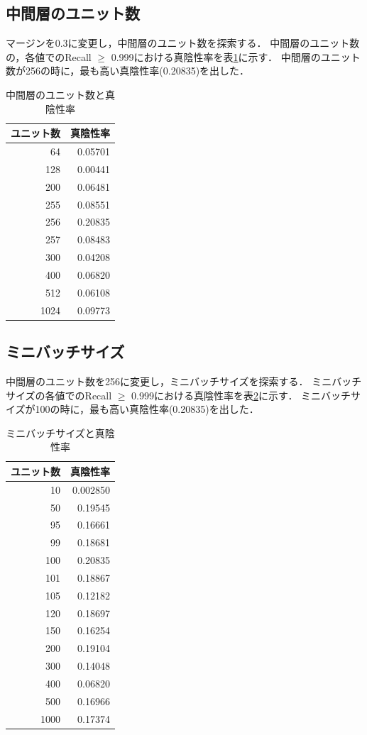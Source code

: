 \documentclass[10pt]{jarticle}
\begin{document}
\subsection{中間層のユニット数}
マージンを0.3に変更し，中間層のユニット数を探索する．
中間層のユニット数の，各値でのRecall $\ge$ 0.999における真陰性率を表\ref{mid}に示す．
中間層のユニット数が256の時に，最も高い真陰性率(0.20835)を出した．
\begin{table}[H]
\centering
\caption{中間層のユニット数と真陰性率}
\label{mid}
\begin{tabular}{rr} \hline
ユニット数 & 真陰性率 \\ \hline
64 & 0.05701  \\ 
128 & 0.00441 \\
200 & 0.06481 \\
255 & 0.08551 \\
256 & 0.20835 \\
257 & 0.08483 \\
300 & 0.04208 \\
400 & 0.06820 \\
512 & 0.06108 \\
1024 & 0.09773 \\ \hline
\end{tabular}
\end{table}

\subsection{ミニバッチサイズ}
中間層のユニット数を256に変更し，ミニバッチサイズを探索する．
ミニバッチサイズの各値でのRecall $\ge$ 0.999における真陰性率を表\ref{batch}に示す．
ミニバッチサイズが100の時に，最も高い真陰性率(0.20835)を出した．
\begin{table}[H]
\centering
\caption{ミニバッチサイズと真陰性率}
\label{batch}
\begin{tabular}{rr} \hline
ユニット数 & 真陰性率 \\ \hline
10 & 0.002850  \\ 
50 & 0.19545 \\
95 & 0.16661 \\
99 & 0.18681 \\
100 & 0.20835 \\
101 & 0.18867 \\
105 & 0.12182 \\
120 & 0.18697 \\
150 & 0.16254 \\
200 & 0.19104 \\
300 & 0.14048 \\
400 & 0.06820 \\
500 & 0.16966 \\
1000 & 0.17374 \\ \hline
\end{tabular}
\end{table}
\end{document}
